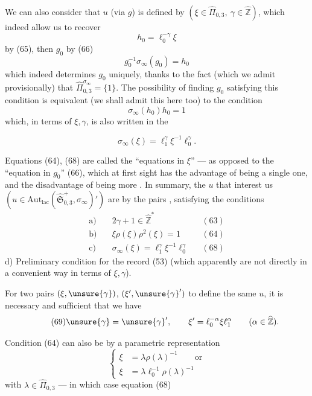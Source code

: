 We can also consider that  $u$ (via $g$) is defined by
$(\xi\in\widehat{\Pi}_{0,3},\ \gamma\in\widehat{\mathbb Z})$, which indeed allow us to recover
\[
h_0=\ell_0^{-\gamma}\xi
\]
by (65), then $g_0$ by (66)
\[
g_0^{-1}\sigma_\infty(g_0)=h_0
\]
which indeed determines $g_0$ uniquely, thanks to the fact (which we admit provisionally)
that $\widehat{\Pi}_{0,3}^{\sigma_\infty}=\{1\}$.
The possibility of finding $g_0$ satisfying this condition is equivalent (we shall admit this here too) to the condition
\[
\tag{67}
\sigma_\infty(h_0)h_0=1
\]
which, in terms of $\xi,\gamma$, is also written in the 


\[
\tag{68}
\boxed{\sigma_\infty(\xi)=\ell_1^\gamma\xi^{-1}\ell_0^\gamma}.
\]

Equations (64), (68) are called the ``equations in $\xi$'' --- as opposed to the ``equation in $g_0$'' (66), which at first sight has the advantage of being a single one, and the disadvantage of being more .
In summary, the $u$ that interest us
$(u\in\mathrm{Aut}_{\mathrm{lac}}(\widehat{\mathfrak S}_{0,3}^{+},\sigma_\infty)')$
are  by the pairs
\deleted{$\unsure{(\xi,\gamma)}$}, satisfying the conditions
\[
\begin{aligned}
\text{a)}\quad&2\gamma+1\in\widehat{\mathbb Z}^{*} &&(63)\\
\text{b)}\quad&\xi\rho(\xi)\rho^2(\xi)=1 &&(64)\\
\text{c)}\quad&\sigma_\infty(\xi)=\ell_1^\gamma\xi^{-1}\ell_0^\gamma &&(68)
\end{aligned}
\]
d) Preliminary condition for the record (53)
(which apparently are not  directly in a convenient way in terms of $\xi,\gamma$).

For two pairs $(\xi,\unsure{\gamma})$, $(\xi',\unsure{\gamma}')$ to define the same $u$, it is necessary and sufficient that we have
\[
\tag{69}
\unsure{\gamma}=\unsure{\gamma}',\qquad
\xi'=\ell_0^{-\alpha}\xi \ell_1^\alpha\qquad(\alpha\in\widehat{\mathbb Z}).
\]

Condition (64) can also be  by a parametric representation
\[
\tag{70}
\left\{
\begin{aligned}
\xi&=\lambda\rho(\lambda)^{-1}\qquad\text{or}\\
\xi&=\lambda \ell_0^{-1}\rho(\lambda)^{-1}
\end{aligned}
\right.
\]
with $\lambda\in\widehat{\Pi}_{0,3}$ --- in which case equation (68)

